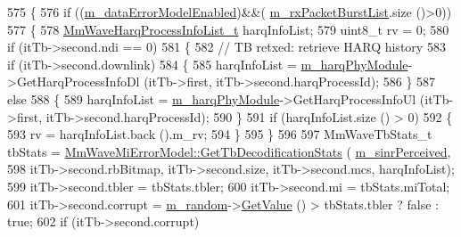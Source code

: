 \begin{DoxyCode}
575         \{
576                 \textcolor{keywordflow}{if} ((\hyperlink{classns3_1_1MmWaveSpectrumPhy_a7a5d1549e8a4692b15a504f41716206c}{m\_dataErrorModelEnabled})&&(
      \hyperlink{classns3_1_1MmWaveSpectrumPhy_ab57ce6deb73d1e7032276863528fa320}{m\_rxPacketBurstList}.size ()>0))
577                 \{
578                         \hyperlink{namespacens3_aca7c6bab455c2515f3e437749b5e904d}{MmWaveHarqProcessInfoList\_t} harqInfoList;
579                         uint8\_t rv = 0;
580                         \textcolor{keywordflow}{if} (itTb->second.ndi == 0)
581                         \{
582                                 \textcolor{comment}{// TB retxed: retrieve HARQ history}
583                                 \textcolor{keywordflow}{if} (itTb->second.downlink)
584                                 \{
585                                         harqInfoList = \hyperlink{classns3_1_1MmWaveSpectrumPhy_a88d377424f8b4ca9745807ef3281e010}{m\_harqPhyModule}->GetHarqProcessInfoDl
       (itTb->first, itTb->second.harqProcessId);
586                                 \}
587                                 \textcolor{keywordflow}{else}
588                                 \{
589                                         harqInfoList = \hyperlink{classns3_1_1MmWaveSpectrumPhy_a88d377424f8b4ca9745807ef3281e010}{m\_harqPhyModule}->GetHarqProcessInfoUl
       (itTb->first, itTb->second.harqProcessId);
590                                 \}
591                                 \textcolor{keywordflow}{if} (harqInfoList.size () > 0)
592                                 \{
593                                         rv = harqInfoList.back ().m\_rv;
594                                 \}
595                         \}
596 
597                         MmWaveTbStats\_t tbStats = 
      \hyperlink{classns3_1_1MmWaveMiErrorModel_a82a14ebf85ae03a7815215c3c1a96cc7}{MmWaveMiErrorModel::GetTbDecodificationStats} (
      \hyperlink{classns3_1_1MmWaveSpectrumPhy_a61da15a483343ea141a555b3712db8d7}{m\_sinrPerceived},
598                                         itTb->second.rbBitmap, itTb->second.size, itTb->second.mcs, 
      harqInfoList);
599                         itTb->second.tbler = tbStats.tbler;
600                         itTb->second.mi = tbStats.miTotal;
601                         itTb->second.corrupt = \hyperlink{classns3_1_1MmWaveSpectrumPhy_a18c1ec685e2ead5bf3edbf40fbfa0fa4}{m\_random}->\hyperlink{classns3_1_1UniformRandomVariable_a03822d8c86ac51e9aa83bbc73041386b}{GetValue} () > tbStats.tbler ? \textcolor{keyword}{
      false} : \textcolor{keyword}{true};
602                         \textcolor{keywordflow}{if} (itTb->second.corrupt)

\end{DoxyCode}
